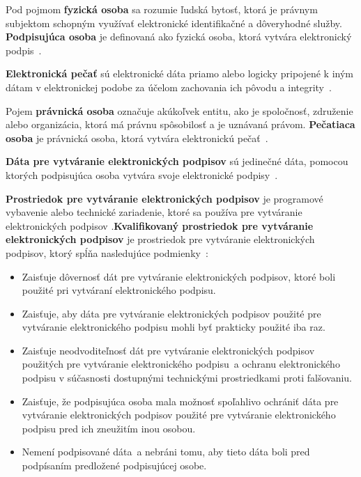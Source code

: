 \documentclass[
  digital,     %
  oneside,     %
  nosansbold,  %
  nocolorbold, %
  lof,         %
  nolot,         %
]{fithesis4}
\begin{document}
Pod pojmom \textbf{fyzická osoba} sa rozumie ľudská bytosť, ktorá je právnym subjektom schopným využívať elektronické identifikačné a dôveryhodné služby. \textbf{Podpisujúca osoba} je definovaná ako fyzická osoba, ktorá vytvára elektronický podpis~\cite[čl.~3,~odst.~9]{eidas2024}.

\textbf{Elektronická pečať} sú elektronické dáta priamo alebo logicky pripojené k iným dátam v elektronickej podobe za účelom zachovania ich pôvodu a integrity~\cite[čl.~3,~odst.~25]{eidas2024}.

Pojem \textbf{právnická osoba} označuje akúkoľvek entitu, ako je spoločnosť, združenie alebo organizácia, ktorá má právnu spôsobilosť a je uznávaná právom. \textbf{Pečatiaca osoba} je právnická osoba, ktorá vytvára elektronickú pečať~\cite[čl.~3,~odst.~9]{eidas2024}.

\textbf{Dáta pre vytváranie elektronických podpisov} sú jedinečné dáta, pomocou ktorých podpisujúca osoba vytvára svoje elektronické podpisy~\cite[čl.~3,~odst.~13]{eidas2024}.

\textbf{Prostriedok pre vytváranie elektronických podpisov} je programové vybavenie alebo technické zariadenie, ktoré sa používa pre vytváranie elektronických podpisov\cite[čl.~3,~odst.~22]{eidas2024} .\textbf{Kvalifikovaný prostriedok pre vytváranie elektronických podpisov} je prostriedok pre vytváranie elektronických podpisov, ktorý spĺňa nasledujúce podmienky~\cite[čl.~3,~odst.~23]{eidas2024}:

\begin{itemize}
  \item Zaisťuje dôvernosť dát pre vytváranie elektronických podpisov, ktoré boli použité pri vytváraní elektronického podpisu.
  \item Zaisťuje, aby dáta pre vytváranie elektronických podpisov použité pre vytváranie elektronického podpisu mohli byť prakticky použité iba raz.
  \item Zaisťuje neodvoditeľnosť dát pre vytváranie elektronických podpisov použitých pre vytváranie elektronického podpisu~a ochranu elektronického podpisu v súčasnosti dostupnými technickými prostriedkami proti falšovaniu.
  \item Zaisťuje, že podpisujúca osoba mala možnosť spoľahlivo ochrániť dáta pre vytváranie elektronických podpisov použité pre vytváranie elektronického podpisu pred ich zneužitím inou osobou.
  \item Nemení podpisované dáta~a nebráni tomu, aby tieto dáta boli pred podpísaním predložené podpisujúcej osobe.~\cite[príloha II]{eidas2024}
\end{itemize}
\end{document}
